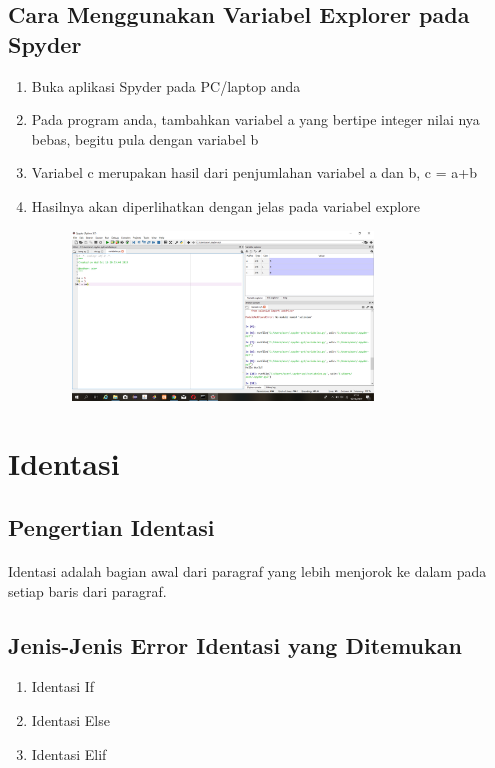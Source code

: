 \documentclass{article}
\begin{document}
\subsection{Cara Menggunakan Variabel Explorer pada Spyder}
\begin{enumerate}
    \item Buka aplikasi Spyder pada PC/laptop anda
    \item Pada program anda, tambahkan variabel a yang bertipe integer nilai nya bebas, begitu pula dengan variabel b
    \item Variabel c merupakan hasil dari penjumlahan variabel a dan b, c = a+b
    \item Hasilnya akan diperlihatkan dengan jelas pada variabel explore
        \begin{figure}[h]
            \centerline{\includegraphics[width=8cm]{image/variabelex.png}}
        \end{figure}
\end{enumerate}
\newpage
\section{Identasi}
\subsection{Pengertian Identasi}
\paragraph{}
    Identasi adalah bagian awal dari paragraf yang lebih menjorok ke dalam pada setiap baris dari paragraf.
\subsection{Jenis-Jenis Error Identasi yang Ditemukan}
\begin{enumerate}
    \item Identasi If
    \item Identasi Else
    \item Identasi Elif
\end{enumerate}
\end{document}
